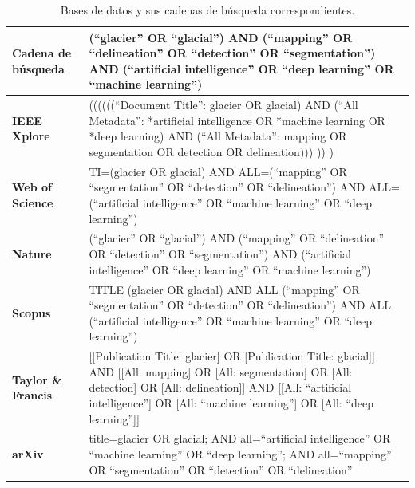 \documentclass{article}
\begin{document}
\begin{table}[H]
    \centering
    \caption{Bases de datos y sus cadenas de búsqueda correspondientes.}
    \hspace{1cm}
    \label{tab:search_queries}
    \begin{tabularx}{\textwidth}{lX}
        \hline
        \textbf{Cadena de búsqueda} & (“glacier” OR “glacial”) AND (“mapping” OR “delineation” OR “detection” OR “segmentation”) AND (“artificial intelligence” OR “deep learning” OR “machine learning”)                                                                                \\ \hline
        \textbf{IEEE Xplore}        & ((((((“Document Title”: glacier OR glacial) AND (“All Metadata”: *artificial intelligence OR *machine learning OR *deep learning) AND (“All Metadata”: mapping OR segmentation OR detection OR delineation))) )) )                                 \\ \hline
        \textbf{Web of Science}     & TI=(glacier OR glacial) AND ALL=(“mapping” OR “segmentation” OR “detection” OR “delineation”) AND ALL=(“artificial intelligence” OR “machine learning” OR “deep learning”)                                                                         \\ \hline
        \textbf{Nature}             & (“glacier” OR “glacial”) AND (“mapping” OR “delineation” OR “detection” OR “segmentation”) AND (“artificial intelligence” OR “deep learning” OR “machine learning”)                                                                                \\ \hline
        \textbf{Scopus}             & TITLE (glacier OR glacial) AND ALL (“mapping” OR “segmentation” OR “detection” OR “delineation”) AND ALL (“artificial intelligence” OR “machine learning” OR “deep learning”)                                                                      \\ \hline
        \textbf{Taylor \& Francis}  & [[Publication Title: glacier] OR [Publication Title: glacial]] AND [[All: mapping] OR [All: segmentation] OR [All: detection] OR [All: delineation]] AND [[All: “artificial intelligence”] OR [All: “machine learning”] OR [All: “deep learning”]] \\ \hline
        \textbf{arXiv}              & title=glacier OR glacial; AND all=“artificial intelligence” OR “machine learning” OR “deep learning”; AND all=“mapping” OR “segmentation” OR “detection” OR “delineation”                                                                          \\ \hline
    \end{tabularx}
\end{table}
\end{document}
